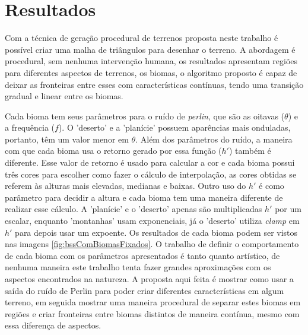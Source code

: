 \chapter{Resultados}
Com a técnica de geração procedural de terrenos proposta neste trabalho é possível criar uma 
malha de triângulos para desenhar o terreno. A abordagem é procedural, sem nenhuma 
intervenção humana, os resultados apresentam regiões para diferentes aspectos de terrenos,
os biomas, o algoritmo proposto é capaz de deixar as fronteiras entre esses com características 
contínuas, tendo uma transição gradual e linear entre os biomas.

Cada bioma tem seus parâmetros para o ruído de \textit{perlin}, que são as oitavas ($\theta$)
e a frequência ($f$). O 'deserto' e a 'planície' possuem aparências mais onduladas, portanto, têm
um valor menor em $\theta$. Além dos parâmetros do ruído, a maneira com que cada 
bioma usa o retorno gerado por essa função ($h'$) também é diferente. Esse valor de retorno
é usado para calcular a cor e cada bioma possui três cores para escolher como fazer o cálculo de interpolação, as cores obtidas se referem às alturas mais elevadas, medianas e baixas. Outro uso do $h'$
é como parâmetro para decidir a altura e cada bioma tem uma maneira diferente de realizar
esse cálculo. A 'planície' e o 'deserto' apenas são multiplicadas $h'$ por um escalar, enquanto
'montanhas' usam exponenciais, já o 'deserto' utiliza \textit{clamp} em $h'$ para depois
usar um expoente. Os resultados de cada bioma podem ser vistos nas imagens \ref{fig:bssComBiomasFixados}.
O trabalho de definir o comportamento de cada bioma com os parâmetros apresentados 
é tanto quanto artístico, de nenhuma maneira este trabalho tenta fazer grandes aproximações
com os aspectos encontrados na natureza. A proposta aqui feita é mostrar como usar
a saída do ruído de Perlin para poder criar diferentes características em algum terreno, em 
seguida mostrar uma maneira procedural de separar estes biomas em regiões e criar fronteiras
entre biomas distintos de maneira contínua, mesmo com essa diferença de aspectos.

